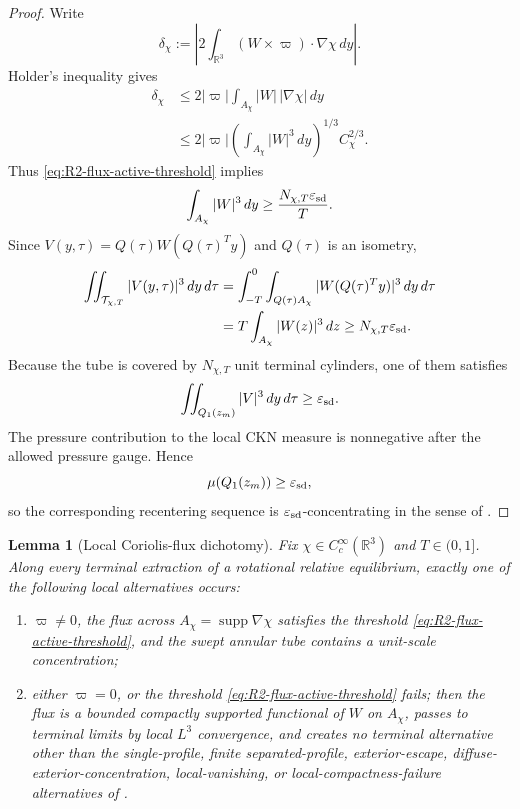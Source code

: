 \documentclass[11pt]{amsart}
\numberwithin{equation}{section}
\theoremstyle{plain}
\newtheorem{lemma}[theorem]{Lemma}
\theoremstyle{definition}
\theoremstyle{remark}
\newcommand{\eps}{\varepsilon}
\begin{document}
\begin{proof}
Write
\[
   \delta_\chi:=
   \left|
      2\int_{\mathbb R^3}(W\times\varpi)\cdot\nabla\chi\,dy
   \right| .
\]
Holder's inequality gives
\[
\begin{aligned}
   \delta_\chi
   &\le
   2|\varpi|\int_{A_\chi}|W|\,|\nabla\chi|\,dy  \\
   &\le
   2|\varpi|
   \left(\int_{A_\chi}|W|^3\,dy\right)^{1/3}
   C_\chi^{2/3}.
\end{aligned}
\]
Thus \eqref{eq:R2-flux-active-threshold} implies
\[
   \int_{A_\chi}|W|^3\,dy\ge \frac{N_{\chi,T}\eps_{\rm sd}}{T}.
\]
Since \(V(y,\tau)=Q(\tau)W(Q(\tau)^Ty)\) and \(Q(\tau)\) is an isometry,
\[
\begin{aligned}
   \iint_{\mathcal T_{\chi,T}} |V(y,\tau)|^3\,dy\,d\tau
   &=
   \int_{-T}^{0}\int_{Q(\tau)A_\chi}
      |W(Q(\tau)^Ty)|^3\,dy\,d\tau \\
   &=
   T\int_{A_\chi}|W(z)|^3\,dz
   \ge N_{\chi,T}\eps_{\rm sd}.
\end{aligned}
\]
Because the tube is covered by \(N_{\chi,T}\) unit terminal cylinders, one of
them satisfies
\[
   \iint_{Q_1(z_m)} |V|^3\,dy\,d\tau\ge \eps_{\rm sd}.
\]
The pressure contribution to the local CKN measure is nonnegative after the
allowed pressure gauge.  Hence
\[
   \mu(Q_1(z_m))\ge \eps_{\rm sd},
\]
so the corresponding recentering sequence is \(\eps_{\rm sd}\)-concentrating in the sense of
.
\end{proof}

\begin{lemma}[Local Coriolis-flux dichotomy]
\label{lem:R2-flux-routing-dichotomy}
Fix \(\chi\in C_c^\infty(\mathbb R^3)\) and \(T\in(0,1]\).  Along every
terminal extraction of a rotational relative equilibrium, exactly one of the
following local alternatives occurs:
\begin{enumerate}[label=(\roman*)]
   \item \(\varpi\ne0\), the flux across
   \(A_\chi=\operatorname{supp}\nabla\chi\) satisfies the threshold
   \eqref{eq:R2-flux-active-threshold}, and the swept annular tube contains a
   unit-scale concentration;
   \item either \(\varpi=0\), or the threshold
   \eqref{eq:R2-flux-active-threshold} fails; then the flux is a bounded
   compactly supported functional of \(W\) on \(A_\chi\), passes to terminal
   limits by local \(L^3\) convergence, and creates no terminal alternative other than
   the single-profile, finite separated-profile, exterior-escape,
   diffuse-exterior-concentration, local-vanishing, or
   local-compactness-failure alternatives of
   .
\end{enumerate}
\end{lemma}
\end{document}
